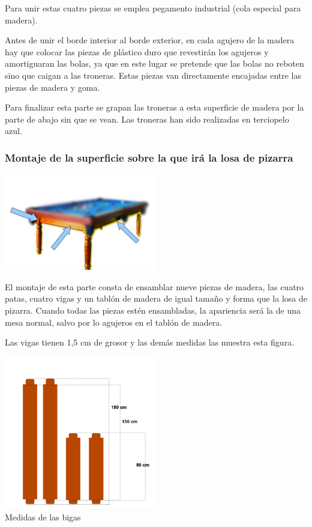 Para unir estas cuatro piezas se emplea pegamento industrial (cola especial para madera).
 
Antes de unir el borde interior al borde exterior, en cada agujero de la madera hay que colocar las piezas de plástico duro que revestirán los agujeros y amortiguaran las bolas, ya que en este 
lugar se pretende que las bolas no reboten sino que caigan a las troneras.  Estas piezas van directamente encajadas entre las piezas de madera y goma.  

Para finalizar esta parte se grapan las troneras a esta superficie de madera por la parte de abajo sin que se vean. Las troneras han sido realizadas en terciopelo azul.


\subsubsection {Montaje de la superficie sobre la que irá la losa de pizarra}

\begin{center}
    		\includegraphics[width=0.5\textwidth]{billar2.png}
	\end{center}


El montaje de esta parte consta de ensamblar nueve piezas de madera, las cuatro patas,  cuatro vigas y un tablón de madera de igual tamaño y forma que la losa de pizarra.
Cuando todas las piezas estén ensambladas, la apariencia será la de una mesa normal, salvo por lo agujeros en el tablón de  madera.

Las vigas tienen 1,5 cm de grosor y las demás medidas las muestra esta figura.

\begin{center}
    		\includegraphics[width=0.5\textwidth]{bigas.png}
		 \\ \small {Medidas de las bigas}
	\end{center}

